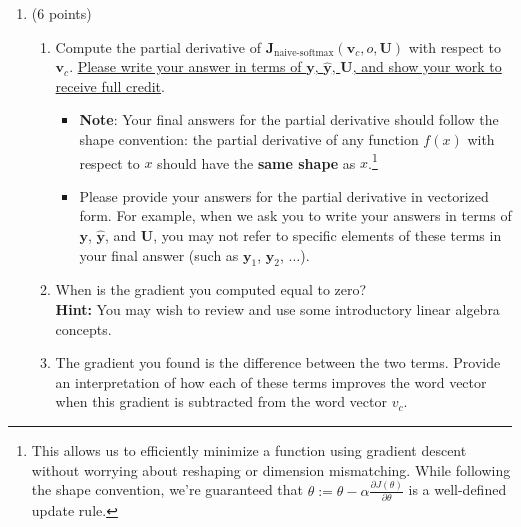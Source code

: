 \documentclass{article}
\begin{document}
\begin{enumerate}[label=(\alph*)]
\item (6 points)
\begin{enumerate}[label=(\roman*)]
    \item 
    Compute the partial derivative of $\bm J_{\text{naive-softmax}}(\bm v_c, o, \bm U)$ with respect to $\bm v_c$. \ul{Please write your answer in terms of $\bm y$, $\hat{\bm y}$, $\bm U$, and show your work to receive full credit}.
    \begin{itemize} 
        \item \textbf{Note}: Your final answers for the partial derivative should follow the shape convention: the partial derivative of any function $f(x)$ with respect to $x$ should have the \textbf{same shape} as $x$.\footnote{This allows us to efficiently minimize a function using gradient descent without worrying about reshaping or dimension mismatching. While following the shape convention, we're guaranteed that $\theta:= \theta - \alpha\frac{\partial J(\theta)}{\partial \theta}$ is a well-defined update rule.}
        \item Please provide your answers for the partial derivative in vectorized form. For example, when we ask you to write your answers in terms of $\bm y$, $\hat{\bm y}$, and $\bm U$, you may not refer to specific elements of these terms in your final answer (such as $\bm y_1$, $\bm y_2$, $\dots$). 
    \end{itemize}
    \item
    When is the gradient you computed equal to zero? \\
    \textbf{Hint:} You may wish to review and use some introductory linear algebra concepts.
    \item
    The gradient you found is the difference between the two terms. Provide an interpretation of how each of these terms improves the word vector when this gradient is subtracted from the word vector $v_c$.

\end{enumerate}


\end{enumerate}
\end{document}
